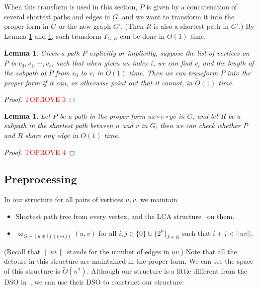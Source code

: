 \documentclass[11pt]{article}
\theoremstyle{plain}
\newtheorem{lemma}[theorem]{Lemma}
\theoremstyle{definition}
\newcommand{\too}[1]{\tilde{O}({#1})}
\newcommand{\odg}[3]{\varpi_{G-#3}\left(#1,#2\right)}
\begin{document}
When this transform is used in this section, $P$ is given by a concatenation of several shortest paths and edges in $G$, and we want to transform it into the proper form in $G$ or the new graph $G'$. (Then $R$ is also a shortest path in $G'$.) By Lemma \ref{lemma2-2} and \ref{lemma2-3}, such transform $T_{G,R}$ can be done in $\tilde{O}(1)$ time.

\begin{lemma}\label{lemma2-2}
Given a path $P$ explicitly or implicitly, suppose the list of vertices on $P$ is $v_0,v_1,\cdots, v_r$, such that when given an index $i$, we can find $v_i$ and the length of the subpath of $P$ from $v_0$ to $v_i$ in $\tilde{O}(1)$ time.
Then we can transform $P$ into the proper form if it can, or otherwise point out that it cannot, in $\too{1}$ time.
\end{lemma}

\begin{proof}\textcolor{red}{TOPROVE 3}\end{proof}

\begin{lemma}\label{lemma2-3}
Let $P$ be a path in the proper form $ux\circ e\circ yv$ in $G$, and let $R$ be a subpath in the shortest path between $u$ and $v$ in $G$, then we can check whether $P$ and $R$ share any edge in $O(1)$ time.
\end{lemma}

\begin{proof}\textcolor{red}{TOPROVE 4}\end{proof}




\subsection{Preprocessing}
In our structure for all pairs of vertices $u,v$, we maintain
\begin{itemize}
    \item Shortest path tree from every vertex, and the LCA structure~\cite{BF00} on them.
\item $\odg{u}{v}{(u \oplus i)(v \ominus j)}$ for all $i, j\in\{0\}\cup\{2^k\}_{k\in\mathbb{N}}$ such that $i+j < ||uv||$.
\end{itemize}

(Recall that $\|uv\|$ stands for the number of edges in $uv$.) Note that all the detours in this structure are maintained in the proper form. We can see the space of this structure is $\tilde{O}(n^2)$.
Although our structure is a little different from the DSO in~\cite{2009A}, we can use their DSO to construct our structure:
\end{document}
